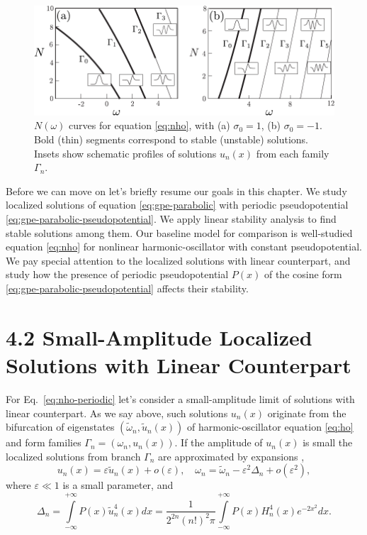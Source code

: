 \begin{figure}[h]
\centering
	\includegraphics[scale = 1]{pic/stability for nho with constant pseudopotential}
	\caption{
		$N(\omega)$ curves for equation \eqref{eq:nho}, with (a) $\sigma_0 = 1$, (b) $\sigma_0 = -1$.
		Bold (thin) segments correspond to stable (unstable) solutions.
		Insets show schematic profiles of solutions $u_n(x)$ from each family $\Gamma_n$.
	}
\label{fig:branches-nho}
\end{figure}

Before we can move on let's briefly resume our goals in this chapter.
We study localized solutions of equation \eqref{eq:gpe-parabolic} with periodic pseudopotential \eqref{eq:gpe-parabolic-pseudopotential}.
We apply linear stability analysis to find stable solutions among them.
Our baseline model for comparison is well-studied equation \eqref{eq:nho} for nonlinear harmonic-oscillator with constant pseudopotential.
We pay special attention to the localized solutions with linear counterpart, and study how the presence of periodic pseudopotential $P(x)$ of the cosine form \eqref{eq:gpe-parabolic-pseudopotential} affects their stability.

\section*{4.2 Small-Amplitude Localized Solutions with Linear Counterpart}

For Eq.~\eqref{eq:nho-periodic} let's consider a small-amplitude limit of solutions with linear counterpart.
As we say above, such solutions $u_n(x)$ originate from the bifurcation of eigenstates $(\tilde{\omega}_n, \tilde{u}_n(x))$ of harmonic-oscillator equation \eqref{eq:ho} and form families $\Gamma_n = (\omega_n, u_n(x))$.
If the amplitude of $u_n(x)$ is small the localized solutions from branch $\Gamma_n$ are approximated by expansions \cite{ZezyulinAlfimovKonotopPerecGarcia2008},
\begin{equation}
	u_n(x) = \varepsilon \tilde{u}_n(x) + o(\varepsilon), \quad \omega_n = \tilde{\omega}_n - \varepsilon^2 \Delta_n + o(\varepsilon^2),
\label{eq:small-amplitude-expansion}
\end{equation}
where $\varepsilon \ll 1$ is a small parameter, and
\begin{equation}
	\Delta_n = \int \limits_{-\infty}^{+\infty} P(x) \tilde{u}_n^4(x) dx = \dfrac{1}{2^{2n} (n!)^2 \pi} \int \limits_{-\infty}^{+\infty} P(x) H_n^4(x) e^{-2x^2} dx.
\label{eq:Delta_n}
\end{equation}

